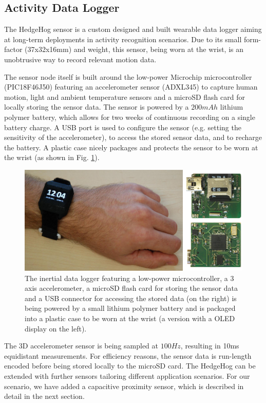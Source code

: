 \documentclass[runningheads,a4paper]{llncs}
\begin{document}
\subsection{Activity Data Logger}
The HedgeHog sensor \cite{hedgehog} is a custom designed and built wearable data logger aiming at long-term deployments in activity recognition scenarios. Due to its small form-factor (37x32x16mm) and weight, this sensor, being worn at the wrist, is an unobtrusive way to record relevant motion data.

The sensor node itself is built around the low-power Microchip microcontroller (PIC18F46J50) featuring an accelerometer sensor (ADXL345) to capture human motion, light and ambient temperature sensors and a microSD flash card for locally storing the sensor data. The sensor is powered by a $200mAh$ lithium polymer battery, which allows for two weeks of continuous recording on a single battery charge. A USB port is used to configure the sensor (e.g. setting the sensitivity of the accelerometer), to access the stored sensor data, and to recharge the battery. A plastic case nicely packages and protects the sensor to be worn at the wrist (as shown in Fig. \ref{fig:sensornode}).

\begin{figure}
	\centering
	\includegraphics[width=\textwidth]{Images/hardware_sensor_2.jpg}
	\caption{The inertial data logger featuring a low-power microcontroller, a 3 axis accelerometer, a microSD flash card for storing the sensor data and a USB connector for accessing the stored data (on the right) is being powered by a small lithium polymer battery and is packaged into a plastic case to be worn at the wrist (a version with a OLED display on the left).}
	\label{fig:sensornode}
\end{figure}

The 3D accelerometer sensor is being sampled at $100Hz$, resulting in 10ms equidistant measurements. For efficiency reasons, the sensor data is run-length encoded before being stored locally to the microSD card. The HedgeHog can be extended with further sensors tailoring different application scenarios. For our scenario, we have added a capacitive proximity sensor, which is described in detail in the next section.
\end{document}
